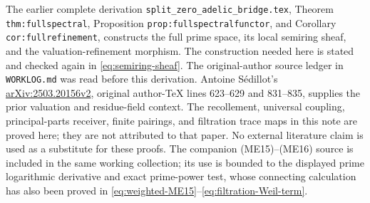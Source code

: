 The earlier complete derivation
\texttt{split\_zero\_adelic\_bridge.tex}, Theorem
\texttt{thm:fullspectral}, Proposition
\texttt{prop:fullspectralfunctor}, and Corollary
\texttt{cor:fullrefinement}, constructs the full prime space, its local
semiring sheaf, and the valuation-refinement morphism. The construction
needed here is stated and checked again in
\eqref{eq:semiring-sheaf}. The original-author source ledger in
\texttt{WORKLOG.md} was read before this derivation. Antoine S\'edillot's
\href{https://arxiv.org/abs/2503.20156v2}{arXiv:2503.20156v2}, original
author-TeX lines 623--629 and 831--835, supplies the prior valuation
and residue-field context. The recollement, universal coupling,
principal-parts receiver, finite pairings, and filtration trace maps
in this note are proved here; they are not attributed to that paper.
No external literature claim is used as a substitute for these proofs.
The companion (ME15)--(ME16) source is included in the same working
collection; its use is bounded to the displayed prime logarithmic
derivative and exact prime-power test, whose connecting calculation
has also been proved in \eqref{eq:weighted-ME15}--\eqref{eq:filtration-Weil-term}.

